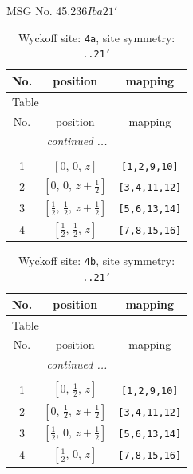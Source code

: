 \documentclass[fleqn,8pt]{jsarticle}
\begin{document}
\setcounter{MaxMatrixCols}{32}

\renewcommand{\tablename}{Table~}
\renewcommand{\figurename}{Figure~}
\begin{center}
\LARGE
MSG No. 45.236\quad$Iba21'$
\end{center}
\renewcommand{\arraystretch}{1.2}
\begin{longtable}{ccc}
\caption{Wyckoff site: {\tt 4a}, site symmetry: {\tt ..21'}}
 \\
 \hline \hline
No. & position & mapping \\ \hline \endfirsthead

\multicolumn{2}{l}{\tablename\ \thetable{}} \\
 \hline \hline
No. & position & mapping \\ \hline \endhead

 \hline \hline
\multicolumn{2}{r}{\footnotesize\it continued ...} \\ \endfoot

 \hline \hline
\multicolumn{2}{r}{} \\ \endlastfoot

1 & $\left[ 0,\, 0,\, z \right]$ & {\tt [1,2,9,10]} \\ \hline
2 & $\left[ 0,\, 0,\, z + \frac{1}{2} \right]$ & {\tt [3,4,11,12]} \\ \hline
3 & $\left[ \frac{1}{2},\, \frac{1}{2},\, z + \frac{1}{2} \right]$ & {\tt [5,6,13,14]} \\ \hline
4 & $\left[ \frac{1}{2},\, \frac{1}{2},\, z \right]$ & {\tt [7,8,15,16]} \\
\end{longtable}
\renewcommand{\arraystretch}{1.2}
\begin{longtable}{ccc}
\caption{Wyckoff site: {\tt 4b}, site symmetry: {\tt ..21'}}
 \\
 \hline \hline
No. & position & mapping \\ \hline \endfirsthead

\multicolumn{2}{l}{\tablename\ \thetable{}} \\
 \hline \hline
No. & position & mapping \\ \hline \endhead

 \hline \hline
\multicolumn{2}{r}{\footnotesize\it continued ...} \\ \endfoot

 \hline \hline
\multicolumn{2}{r}{} \\ \endlastfoot

1 & $\left[ 0,\, \frac{1}{2},\, z \right]$ & {\tt [1,2,9,10]} \\ \hline
2 & $\left[ 0,\, \frac{1}{2},\, z + \frac{1}{2} \right]$ & {\tt [3,4,11,12]} \\ \hline
3 & $\left[ \frac{1}{2},\, 0,\, z + \frac{1}{2} \right]$ & {\tt [5,6,13,14]} \\ \hline
4 & $\left[ \frac{1}{2},\, 0,\, z \right]$ & {\tt [7,8,15,16]} \\
\end{longtable}
\end{document}

